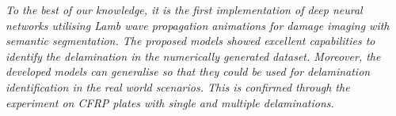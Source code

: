 \documentclass[11pt,a2paper]{report}
\begin{document}
\emph{To the best of our knowledge, it is the first
implementation of deep neural networks utilising Lamb wave propagation animations
for damage imaging with semantic segmentation. 
The proposed models
showed excellent capabilities to identify the delamination in the numerically
generated dataset.
Moreover, the developed models can generalise so that they could be used for delamination
identification in the real world scenarios.
This is confirmed through the experiment on CFRP plates with single and multiple delaminations.}
	\\ \\
\end{document}
